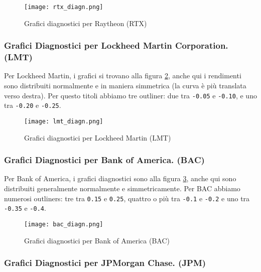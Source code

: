 \vspace{3cm}

\begin{figure}[h]
  \centering
  \texttt{[image: rtx\_diagn.png]}
  \caption{Grafici diagnostici per Raytheon (RTX)}
  \label{fig:rtx_diagn}
\end{figure}

\pagebreak

\subsubsection{Grafici Diagnostici per Lockheed Martin Corporation. (LMT)}

Per Lockheed Martin, i grafici si trovano alla figura \ref{fig:lmt_diagn}, anche qui i rendimenti sono distribuiti normalmente e in maniera simmetrica (la curva è più translata verso destra).
Per questo titoli abbiamo tre outliner: due tra \verb|-0.05| e \verb|-0.10|, e uno tra \verb|-0.20| e \verb|-0.25|.

\vspace{3cm}

\begin{figure}[h]
  \centering
  \texttt{[image: lmt\_diagn.png]}
  \caption{Grafici diagnostici per Lockheed Martin (LMT)}
  \label{fig:lmt_diagn}
\end{figure}

\pagebreak

\subsubsection{Grafici Diagnostici per Bank of America. (BAC)}

Per Bank of America, i grafici diagnostici sono alla figura \ref{fig:bac_diagn}, anche qui sono distribuiti generalmente normalmente e simmetricamente.
Per BAC abbiamo numerosi outliners: tre tra \verb|0.15| e \verb|0.25|, quattro o più tra \verb|-0.1| e \verb|-0.2| e uno tra \verb|-0.35| e \verb|-0.4|.

\vspace{3cm}

\begin{figure}[h]
  \centering
  \texttt{[image: bac\_diagn.png]}
  \caption{Grafici diagnostici per Bank of America (BAC)}
  \label{fig:bac_diagn}
\end{figure}

\pagebreak

\subsubsection{Grafici Diagnostici per JPMorgan Chase. (JPM)}

